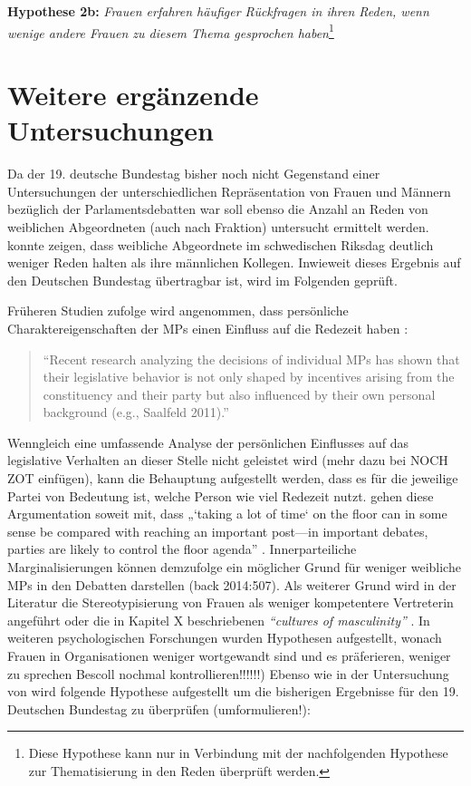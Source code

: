 \documentclass[12pt, 
    twoside=false, 
    bibliography=totoc, 
    numbers=endperiod, 
    headings=normal, 
    toc=chapterentrydotfill
    ]{scrbook}
\begin{document}
\textbf{Hypothese 2b:} \emph{Frauen erfahren häufiger Rückfragen in ihren Reden, wenn wenige andere Frauen zu diesem Thema gesprochen haben}\footnote{Diese Hypothese kann nur in Verbindung mit der nachfolgenden Hypothese zur Thematisierung in den Reden überprüft werden.}

\section{Weitere ergänzende Untersuchungen}

Da der 19. deutsche Bundestag bisher noch nicht Gegenstand einer Untersuchungen der unterschiedlichen Repräsentation von Frauen und Männern bezüglich der Parlamentsdebatten war soll ebenso die Anzahl an Reden von weiblichen Abgeordneten (auch nach Fraktion) untersucht ermittelt werden. \textcite{back_2014} konnte zeigen, dass weibliche Abgeordnete im schwedischen Riksdag deutlich weniger Reden halten als ihre männlichen Kollegen. Inwieweit dieses Ergebnis auf den Deutschen Bundestag übertragbar ist, wird im Folgenden geprüft.

Früheren Studien zufolge wird angenommen, dass persönliche Charaktereigenschaften der MPs einen Einfluss auf die Redezeit haben \parencite[505]{back_2014}:

\begin{quote}
    \enquote{Recent research analyzing the decisions of individual MPs has shown that their legislative behavior is not only shaped by incentives arising from the constituency and their party but also influenced by their own personal background (e.g., Saalfeld 2011).}
\end{quote} \parencite[505]{back_2014}
 
Wenngleich eine umfassende Analyse der persönlichen Einflusses auf das legislative Verhalten an dieser Stelle nicht geleistet wird (mehr dazu bei \textcite{saalfeld_2011} NOCH ZOT einfügen), kann die Behauptung aufgestellt werden, dass es für die jeweilige Partei von Bedeutung ist, welche Person wie viel Redezeit nutzt. \textcite{proksch_2012} gehen diese Argumentation soweit mit, dass „‘taking a lot of time‘ on the floor can in some sense be compared with reaching an important post—in important debates, parties are likely to control the floor agenda” \parencites[507]{back_2014}. Innerparteiliche Marginalisierungen können demzufolge ein möglicher Grund für weniger weibliche MPs in den Debatten darstellen (back 2014:507). Als weiterer Grund wird in der Literatur die Stereotypisierung von Frauen als weniger kompetentere Vertreterin angeführt oder die in Kapitel X beschriebenen  \emph{“cultures of masculinity”}  \parencites[507]{back_2014}{lovenduski_2005}. In weiteren psychologischen Forschungen wurden Hypothesen aufgestellt, wonach Frauen in Organisationen weniger wortgewandt sind und es präferieren, weniger zu sprechen \parencites[507]{back_2014}[625]{brescoll_2011} Bescoll nochmal kontrollieren!!!!!!)
Ebenso wie in der Untersuchung von \textcite{back_2014} wird folgende Hypothese aufgestellt um die bisherigen Ergebnisse für den 19. Deutschen Bundestag zu überprüfen (umformulieren!):
\end{document}
